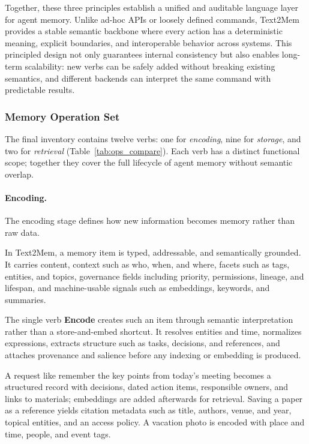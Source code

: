 \documentclass[conference]{IEEEtran}
\begin{document}
Together, these three principles establish a unified and auditable language layer for agent memory.  
Unlike ad-hoc APIs or loosely defined commands, Text2Mem provides a stable semantic backbone where every action has a deterministic meaning, explicit boundaries, and interoperable behavior across systems.  
This principled design not only guarantees internal consistency but also enables long-term scalability: new verbs can be safely added without breaking existing semantics, and different backends can interpret the same command with predictable results.  

\subsubsection{\textbf{Memory Operation Set}}
\label{subsubsec:memory-ops}

The final inventory contains twelve verbs: one for \emph{encoding}, nine for \emph{storage}, and two for \emph{retrieval} (Table~\ref{tab:ops_compare}). Each verb has a distinct functional scope; together they cover the full lifecycle of agent memory without semantic overlap.

\paragraph{Encoding.}

The encoding stage defines how new information becomes memory rather than raw data. 

In Text2Mem, a memory item is typed, addressable, and semantically grounded. It carries content, context such as who, when, and where, facets such as tags, entities, and topics, governance fields including priority, permissions, lineage, and lifespan, and machine-usable signals such as embeddings, keywords, and summaries. 

The single verb \textbf{Encode} creates such an item through semantic interpretation rather than a store-and-embed shortcut. It resolves entities and time, normalizes expressions, extracts structure such as tasks, decisions, and references, and attaches provenance and salience before any indexing or embedding is produced. 

A request like remember the key points from today’s meeting becomes a structured record with decisions, dated action items, responsible owners, and links to materials; embeddings are added afterwards for retrieval. Saving a paper as a reference yields citation metadata such as title, authors, venue, and year, topical entities, and an access policy. A vacation photo is encoded with place and time, people, and event tags. 
\end{document}
